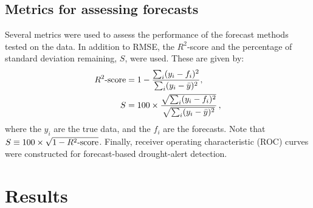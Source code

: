 \documentclass[review]{elsarticle}
\begin{document}


\subsection{Metrics for assessing forecasts}
Several metrics were used to assess the performance of the forecast methods tested on the data. In addition to RMSE, the $R^2$-score and the percentage of standard deviation remaining, $S$, were used. These are given by:
\begin{align}
	R^2{\text -}{\rm score} &= 1 - \frac{\sum_i (y_i - f_i)^2 }{\sum_i (y_i - \bar{y})^2}, \label{eq:r2} \\
	S &= 100 \times \frac{\sqrt{ \sum_i (y_i-f_i)^2 }}{\sqrt{  \sum_i (y_i-\bar{y})^2 }} \label{eq:S}\,,
\end{align}
where the $y_i$ are the true data, and the $f_i$ are the forecasts. Note that $S\equiv 100\times\sqrt{1-R^2{\text -}\rm{score}}$.  Finally, receiver operating characteristic (ROC) curves were constructed for forecast-based drought-alert detection. 

\section{Results} \label{sec:results}

\subsection{}
\end{document}
